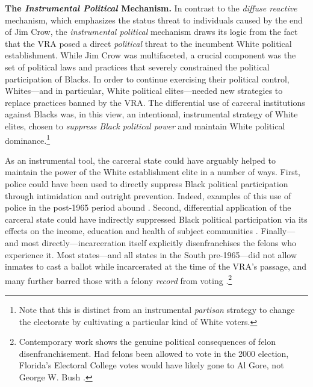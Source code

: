 \documentclass[12pt]{article}
\begin{document}
\vspace{.12in}
\textbf{The \emph{Instrumental Political} Mechanism.} \text{  } In contrast to the \emph{diffuse reactive} mechanism, which emphasizes the status threat to individuals caused by the end of Jim Crow, the \emph{instrumental political} mechanism draws its logic from the fact that the VRA posed a direct \emph{political} threat to the incumbent White political establishment.  While Jim Crow was multifaceted, a crucial component was the set of political laws and practices that severely constrained the political participation of Blacks. In order to continue exercising their political control, Whites---and in particular, White political elites---needed new strategies to replace practices banned by the VRA.  The differential use of carceral institutions against Blacks was, in this view, an intentional, instrumental strategy of White elites, chosen to \emph{suppress Black political power} and maintain White political dominance.\footnote{Note that this is distinct from an instrumental \emph{partisan} strategy to change the electorate by cultivating a particular kind of White voters.}

As an instrumental tool, the carceral state could have arguably helped to maintain the power of the White establishment elite in a number of ways.  First, police could have been used to directly suppress Black political participation through intimidation and outright prevention. Indeed, examples of this use of police in the post-1965 period abound \citep{CivilRightsCommission:1975vd}. Second, differential application of the carceral state could have indirectly suppressed Black political participation via its effects on the income, education and health of subject communities \citep{Western:2007ut,Burch:2014ug}.  Finally---and most directly---incarceration itself explicitly disenfranchises the felons who experience it.  Most states---and all states in the South pre-1965---did not allow inmates to cast a ballot while incarcerated at the time of the VRA's passage, and many further barred those with a felony \emph{record} from voting \citep{Manza:2008vp}.\footnote{Contemporary work shows the genuine political consequences of felon disenfranchisement.  Had felons been allowed to vote in the 2000 election, Florida's Electoral College votes would have likely gone to Al Gore, not George W. Bush \cite{Uggen:2002th}.}
\end{document}
